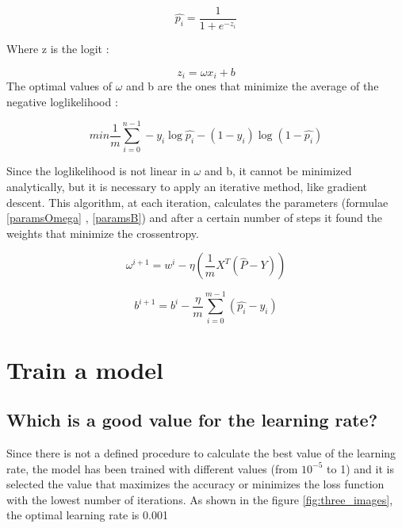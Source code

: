 \documentclass{article}
\begin{document}
\begin{equation}\label{Sigmoid}
  \hat{p_i}= \frac{1}{1+e^{-z_i}}
\end{equation}

\noindent
Where z is the logit :

\begin{equation}\label{logit}
  z_i = \omega x_i + b
\end{equation}
\noindent
The optimal values of $ \omega$ and b are the ones that minimize the average of the negative loglikelihood :

\begin{equation}\label{nloglikelihood}
  min \frac{1}{m}\sum_{i=0}^{n-1} -y_i\log{\hat{p_i}}-(1-y_i)\log{(1-\hat{p_i})}\end{equation}


\noindent
Since the loglikelihood is not linear in $ \omega$ and b, it cannot be minimized analytically,
but it is necessary to apply an iterative method, like gradient descent.
This algorithm, at each iteration, calculates the parameters
(formulae \ref*{paramsOmega} , \ref*{paramsB}) and after a certain number of steps it found the weights that minimize the crossentropy.





\begin{equation}\label{paramsOmega}
  \omega^{i+1}= w^i -\eta(\frac{1}{m}X^T(\hat{P}-Y))
\end{equation}

\begin{equation}\label{paramsB}
  b^{i+1}= b^i -\frac{\eta}{m}\sum_{i=0}^{m-1}(\hat{p_i}-y_i)
\end{equation}

\clearpage

\section{Train a model}
\subsection{Which is a good value for the learning rate?}
Since there is not a defined procedure to calculate the best value of the learning rate,
the model has been trained with different values (from $10^{-5}$ to 1) and it is selected
the value that maximizes the accuracy or minimizes the loss function with the lowest number of iterations.
As shown in the figure \ref*{fig:three_images}, the optimal learning rate is 0.001
\end{document}
